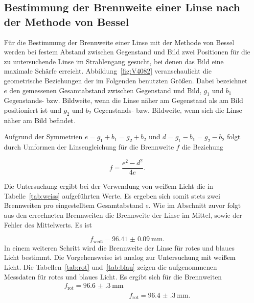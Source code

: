 \documentclass[
  parskip=half,
  bibliography=totoc,     %
  captions=tableheading,  %
  titlepage=firstiscover, %
]{scrartcl}
\begin{document}
\subsection{Bestimmung der Brennweite einer Linse nach der Methode von Bessel}

Für die Bestimmung der Brennweite einer Linse mit der Methode von Bessel werden bei festem
Abstand zwischen Gegenstand und Bild zwei Positionen für die zu untersuchende Linse im Strahlengang
gesucht, bei denen das Bild eine maximale Schärfe erreicht. Abbildung~\ref{fig:V4082} veranschaulicht
die geometrische Beziehungen der im Folgenden benutzten Größen. Dabei bezeichnet $e$ den gemessenen
Gesamtabstand zwischen Gegenstand und Bild, $g_1$ und $b_1$ Gegenstands- bzw. Bildweite, wenn die Linse
näher am Gegenstand als am Bild positioniert ist und $g_2$ und $b_2$ Gegenstands- bzw. Bildweite, wenn
sich die Linse näher am Bild befindet.

Aufgrund der Symmetrien $e=g_1+b_1=g_2+b_2$ und $d=g_1-b_1=g_2-b_2$ folgt durch Umformen der
Linsengleichung für die Brennweite $f$ die Beziehung

\begin{equation}
    f=\frac{e^2-d^2}{4e}.
\end{equation}

Die Untersuchung ergibt bei der Verwendung von weißem Licht die in
Tabelle~\ref{tab:weiss} aufgeführten Werte. Es ergeben sich somit stets zwei Brennweiten
pro eingestelltem Gesamtabstand $e$. Wie im Abschnitt zuvor folgt aus den errechneten Brennweiten die
Brennweite der Linse im Mittel, sowie der Fehler des Mittelwerts. Es ist

\begin{equation}
    f_{\text{weiß}} = \SI{96.41(9)}{\milli\metre}.
\end{equation}
In einem weiteren Schritt wird die Brennweite der Linse für rotes und blaues Licht bestimmt. Die
Vorgehensweise ist analog zur Untersuchung mit weißem Licht. Die Tabellen~\ref{tab:rot}
und~\ref{tab:blau} zeigen die aufgenommenen Messdaten für rotes und blaues Licht. Es
ergibt sich für die Brennweiten
%
\begin{align}
    f_{\text{rot}} = \SI{96.6(3)}{\milli\metre}\\
    &f_{\text{rot}} = \SI{96.4(3)}{\milli\metre}.
\end{align}
\end{document}
